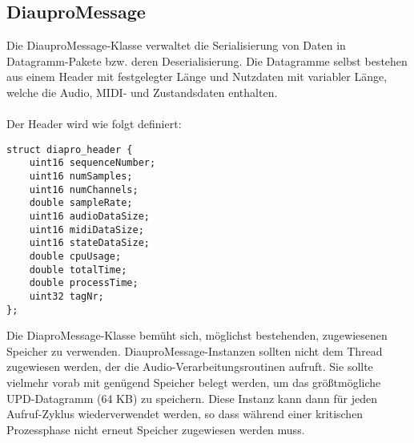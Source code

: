 \subsection{DiauproMessage}

Die DiauproMessage-Klasse verwaltet die Serialisierung von Daten in Datagramm-Pakete bzw. deren Deserialisierung. Die Datagramme selbst bestehen aus einem Header mit festgelegter Länge und Nutzdaten mit variabler Länge, welche die Audio, MIDI- und Zustandsdaten enthalten.\\
\\
Der Header wird wie folgt definiert:

\begin{lstlisting}
struct diapro_header {
    uint16 sequenceNumber;
    uint16 numSamples;
    uint16 numChannels;
    double sampleRate;
    uint16 audioDataSize;
    uint16 midiDataSize;
    uint16 stateDataSize;
    double cpuUsage;
    double totalTime;
    double processTime;
    uint32 tagNr;
};
\end{lstlisting}

Die DiaproMessage-Klasse bemüht sich, möglichst bestehenden, zugewiesenen Speicher zu verwenden. DiauproMessage-Instanzen sollten nicht dem Thread zugewiesen werden, der die Audio-Verarbeitungsroutinen aufruft. Sie sollte vielmehr vorab mit genügend Speicher belegt werden, um das größtmögliche UPD-Datagramm  (64 KB) zu speichern. Diese Instanz kann dann für jeden Aufruf-Zyklus wiederverwendet werden, so dass während einer kritischen Prozessphase nicht erneut Speicher zugewiesen werden muss.
